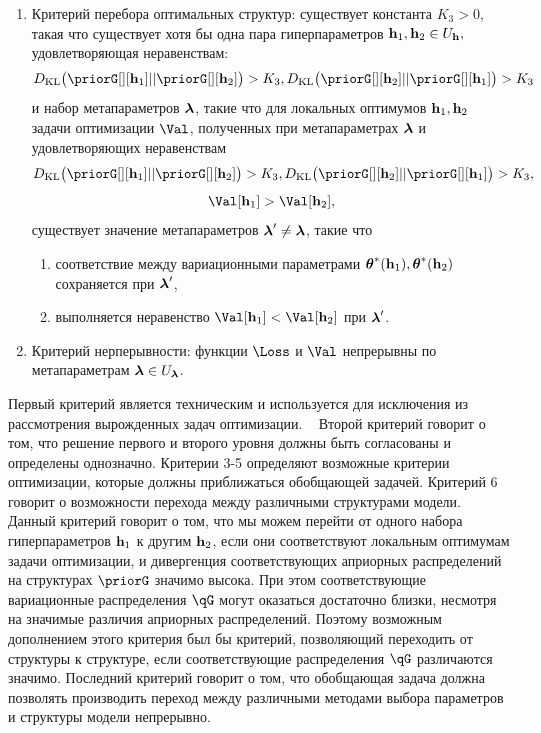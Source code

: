 \begin{defin}
\begin{enumerate}
\item Критерий перебора оптимальных структур: существует константа $K_3>0$, такая что существует хотя бы одна пара гиперпараметров $\mathbf{h}_1, \mathbf{h}_2 \in U_{\mathbf{h}},$ удовлетворяющая неравенствам:
$$\KL{\priorG[][\h_1]}{\priorG[][\h_2]} > K_3,\KL{\priorG[][\h_2]}{\priorG[][\h_1]}>K_3$$ и набор метапараметров $\boldsymbol{\lambda}$, такие что для локальных оптимумов  $\mathbf{h}_1,\mathbf{h}_2$ задачи оптимизации $\Val$, полученных при метапараметрах $\boldsymbol{\lambda}$ и удовлетворяющих неравенствам $$\KL{\priorG[][\h_1]}{\priorG[][\h_2]} > K_3, \KL{\priorG[][\h_2]}{\priorG[][\h_1]}>K_3,$$$$\Val[\h_1] > \Val[\h_2],$$  существует значение метапараметров $\boldsymbol{\lambda}' \neq \boldsymbol{\lambda}$, такие что
\begin{enumerate}
\item соответствие между вариационными параметрами $\boldsymbol{\theta}^{*}(\mathbf{h}_1),\boldsymbol{\theta}^{*}(\mathbf{h}_2)$ сохраняется при  $\boldsymbol{\lambda}'$,
\item выполняется неравенство $\Val[\h_1] < \Val[\h_2]$ при $\boldsymbol{\lambda}'$.
\end{enumerate}


\item Критерий нерперывности: функции $\Loss$ и $\Val$ непрерывны по метапараметрам $\boldsymbol{\lambda} \in U_{\boldsymbol{\lambda}}$.
\end{enumerate}
\end{defin}
Первый критерий является техническим и используется для исключения из рассмотрения вырожденных задач оптимизации.  
Второй критерий говорит о том, что решение первого и второго уровня должны быть согласованы и определены однозначно.
Критерии 3-5 определяют возможные критерии оптимизации, которые должны приближаться обобщающей задачей.
Критерий 6 говорит о возможности перехода между различными структурами модели. Данный критерий говорит о том, что мы можем перейти от одного набора гиперпараметров $\mathbf{h}_1$ к другим $\mathbf{h}_2$, если они соответствуют локальным оптимумам задачи оптимизации, и дивергенция соответствующих априорных  распределений на структурах $\priorG$ значимо высока. При этом соответствующие вариационные распределения $\qG$ могут оказаться достаточно близки, несмотря на значимые различия априорных распределений. Поэтому возможным дополнением этого критерия был бы критерий, позволяющий переходить от структуры к структуре, если соответствующие распределения $\qG$ различаются значимо.
Последний критерий говорит о том, что обобщающая задача должна позволять производить переход между различными методами выбора  параметров и структуры модели непрерывно.

